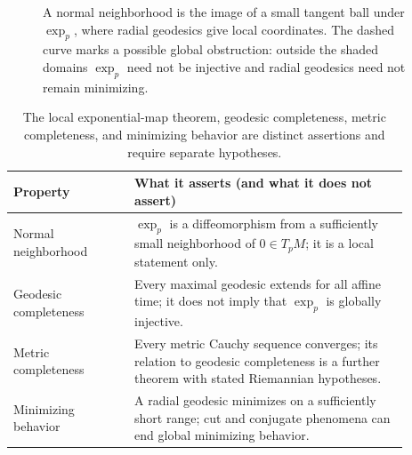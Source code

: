 \begin{figure}[htbp]
\centering
{}
\caption{A normal neighborhood is the image of a small tangent ball under $\exp_p$, where radial geodesics give local coordinates. The dashed curve marks a possible global obstruction: outside the shaded domains $\exp_p$ need not be injective and radial geodesics need not remain minimizing.}
\label{fig:vii23-c15-exponential-scope}
\end{figure}

\begin{table}[htbp]
\centering\small
\begin{tabular}{p{0.27\linewidth}p{0.61\linewidth}}
\toprule
Property & What it asserts (and what it does not assert)\\
\midrule
Normal neighborhood & $\exp_p$ is a diffeomorphism from a sufficiently small neighborhood of $0\in T_pM$; it is a local statement only.\\
Geodesic completeness & Every maximal geodesic extends for all affine time; it does not imply that $\exp_p$ is globally injective.\\
Metric completeness & Every metric Cauchy sequence converges; its relation to geodesic completeness is a further theorem with stated Riemannian hypotheses.\\
Minimizing behavior & A radial geodesic minimizes on a sufficiently short range; cut and conjugate phenomena can end global minimizing behavior.\\
\bottomrule
\end{tabular}
\caption{The local exponential-map theorem, geodesic completeness, metric completeness, and minimizing behavior are distinct assertions and require separate hypotheses.}
\label{tab:vii23-c15-completeness-distinction}
\end{table}
